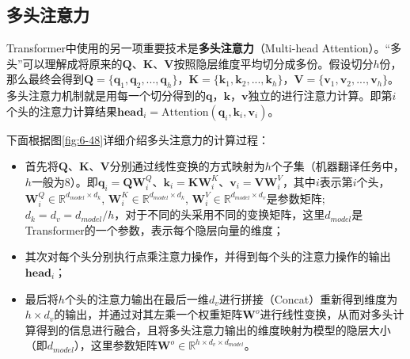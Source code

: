 
\subsection{多头注意力}

\parinterval Transformer中使用的另一项重要技术是{\small\sffamily\bfseries{多头注意力}}（Multi-head Attention）。``多头''可以理解成将原来的$\mathbf{Q}$、$\mathbf{K}$、$\mathbf{V}$按照隐层维度平均切分成多份。假设切分$h$份，那么最终会得到$\mathbf{Q} = \{ \mathbf{q}_1, \mathbf{q}_2,...,\mathbf{q}_h \}$，$\mathbf{K}=\{ \mathbf{k}_1,\mathbf{k}_2,...,\mathbf{k}_h \}$，$\mathbf{V}=\{ \mathbf{v}_1, \mathbf{v}_2,...,\mathbf{v}_h \}$。多头注意力机制就是用每一个切分得到的$\mathbf{q}$，$\mathbf{k}$，$\mathbf{v}$独立的进行注意力计算。即第$i$个头的注意力计算结果$\mathbf{head}_i = \textrm{Attention}(\mathbf{q}_i,\mathbf{k}_i, \mathbf{v}_i)$。

\parinterval 下面根据图\ref{fig:6-48}详细介绍多头注意力的计算过程：

\begin{itemize}
\vspace{0.5em}
\item	首先将$\mathbf{Q}$、$\mathbf{K}$、$\mathbf{V}$分别通过线性变换的方式映射为$h$个子集（机器翻译任务中，$h$一般为8）。即$\mathbf{q}_i = \mathbf{Q}\mathbf{W}_i^Q $、$\mathbf{k}_i = \mathbf{K}\mathbf{W}_i^K $、$\mathbf{v}_i = \mathbf{V}\mathbf{W}_i^V $，其中$i$表示第$i$个头， $\mathbf{W}_i^Q  \in \mathbb{R}^{d_{model} \times d_k}$,  $\mathbf{W}_i^K  \in \mathbb{R}^{d_{model} \times d_k}$,  $\mathbf{W}_i^V  \in \mathbb{R}^{d_{model} \times d_v}$是参数矩阵; $d_k=d_v=d_{model} / h$，对于不同的头采用不同的变换矩阵，这里$d_{model}$是Transformer的一个参数，表示每个隐层向量的维度；
\vspace{0.5em}
\item 其次对每个头分别执行点乘注意力操作，并得到每个头的注意力操作的输出$\mathbf{head}_i$；
\vspace{0.5em}
\item	最后将$h$个头的注意力输出在最后一维$d_v$进行拼接（Concat）重新得到维度为$h \times d_v$的输出，并通过对其左乘一个权重矩阵$\mathbf{W}^o$进行线性变换，从而对多头计算得到的信息进行融合，且将多头注意力输出的维度映射为模型的隐层大小（即$d_{model}$），这里参数矩阵$\mathbf{W}^o \in \mathbb{R}^{h \times d_v \times d_{model}}$。
\vspace{0.5em}
\end{itemize}

